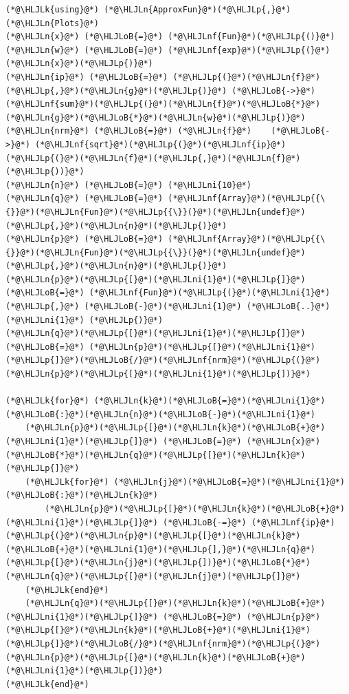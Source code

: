 \documentclass[12pt,a4paper]{article}
\newcommand{\HLJLk}[1]{\textcolor[RGB]{148,91,176}{\textbf{#1}}}
\newcommand{\HLJLn}[1]{#1}
\newcommand{\HLJLnf}[1]{\textcolor[RGB]{66,102,213}{#1}}
\newcommand{\HLJLni}[1]{\textcolor[RGB]{59,151,46}{#1}}
\newcommand{\HLJLoB}[1]{\textcolor[RGB]{102,102,102}{\textbf{#1}}}
\newcommand{\HLJLp}[1]{#1}
\begin{document}
\begin{lstlisting}
(*@\HLJLk{using}@*) (*@\HLJLn{ApproxFun}@*)(*@\HLJLp{,}@*) (*@\HLJLn{Plots}@*)
(*@\HLJLn{x}@*) (*@\HLJLoB{=}@*) (*@\HLJLnf{Fun}@*)(*@\HLJLp{()}@*)
(*@\HLJLn{w}@*) (*@\HLJLoB{=}@*) (*@\HLJLnf{exp}@*)(*@\HLJLp{(}@*)(*@\HLJLn{x}@*)(*@\HLJLp{)}@*)
(*@\HLJLn{ip}@*) (*@\HLJLoB{=}@*) (*@\HLJLp{(}@*)(*@\HLJLn{f}@*)(*@\HLJLp{,}@*)(*@\HLJLn{g}@*)(*@\HLJLp{)}@*) (*@\HLJLoB{->}@*) (*@\HLJLnf{sum}@*)(*@\HLJLp{(}@*)(*@\HLJLn{f}@*)(*@\HLJLoB{*}@*)(*@\HLJLn{g}@*)(*@\HLJLoB{*}@*)(*@\HLJLn{w}@*)(*@\HLJLp{)}@*)
(*@\HLJLn{nrm}@*) (*@\HLJLoB{=}@*) (*@\HLJLn{f}@*)    (*@\HLJLoB{->}@*) (*@\HLJLnf{sqrt}@*)(*@\HLJLp{(}@*)(*@\HLJLnf{ip}@*)(*@\HLJLp{(}@*)(*@\HLJLn{f}@*)(*@\HLJLp{,}@*)(*@\HLJLn{f}@*)(*@\HLJLp{))}@*)
(*@\HLJLn{n}@*) (*@\HLJLoB{=}@*) (*@\HLJLni{10}@*)
(*@\HLJLn{q}@*) (*@\HLJLoB{=}@*) (*@\HLJLnf{Array}@*)(*@\HLJLp{{\{}}@*)(*@\HLJLn{Fun}@*)(*@\HLJLp{{\}}(}@*)(*@\HLJLn{undef}@*)(*@\HLJLp{,}@*)(*@\HLJLn{n}@*)(*@\HLJLp{)}@*)
(*@\HLJLn{p}@*) (*@\HLJLoB{=}@*) (*@\HLJLnf{Array}@*)(*@\HLJLp{{\{}}@*)(*@\HLJLn{Fun}@*)(*@\HLJLp{{\}}(}@*)(*@\HLJLn{undef}@*)(*@\HLJLp{,}@*)(*@\HLJLn{n}@*)(*@\HLJLp{)}@*)
(*@\HLJLn{p}@*)(*@\HLJLp{[}@*)(*@\HLJLni{1}@*)(*@\HLJLp{]}@*) (*@\HLJLoB{=}@*) (*@\HLJLnf{Fun}@*)(*@\HLJLp{(}@*)(*@\HLJLni{1}@*)(*@\HLJLp{,}@*) (*@\HLJLoB{-}@*)(*@\HLJLni{1}@*) (*@\HLJLoB{..}@*) (*@\HLJLni{1}@*) (*@\HLJLp{)}@*)
(*@\HLJLn{q}@*)(*@\HLJLp{[}@*)(*@\HLJLni{1}@*)(*@\HLJLp{]}@*) (*@\HLJLoB{=}@*) (*@\HLJLn{p}@*)(*@\HLJLp{[}@*)(*@\HLJLni{1}@*)(*@\HLJLp{]}@*)(*@\HLJLoB{/}@*)(*@\HLJLnf{nrm}@*)(*@\HLJLp{(}@*)(*@\HLJLn{p}@*)(*@\HLJLp{[}@*)(*@\HLJLni{1}@*)(*@\HLJLp{])}@*)

(*@\HLJLk{for}@*) (*@\HLJLn{k}@*)(*@\HLJLoB{=}@*)(*@\HLJLni{1}@*)(*@\HLJLoB{:}@*)(*@\HLJLn{n}@*)(*@\HLJLoB{-}@*)(*@\HLJLni{1}@*)
    (*@\HLJLn{p}@*)(*@\HLJLp{[}@*)(*@\HLJLn{k}@*)(*@\HLJLoB{+}@*)(*@\HLJLni{1}@*)(*@\HLJLp{]}@*) (*@\HLJLoB{=}@*) (*@\HLJLn{x}@*)(*@\HLJLoB{*}@*)(*@\HLJLn{q}@*)(*@\HLJLp{[}@*)(*@\HLJLn{k}@*)(*@\HLJLp{]}@*)
    (*@\HLJLk{for}@*) (*@\HLJLn{j}@*)(*@\HLJLoB{=}@*)(*@\HLJLni{1}@*)(*@\HLJLoB{:}@*)(*@\HLJLn{k}@*)
        (*@\HLJLn{p}@*)(*@\HLJLp{[}@*)(*@\HLJLn{k}@*)(*@\HLJLoB{+}@*)(*@\HLJLni{1}@*)(*@\HLJLp{]}@*) (*@\HLJLoB{-=}@*) (*@\HLJLnf{ip}@*)(*@\HLJLp{(}@*)(*@\HLJLn{p}@*)(*@\HLJLp{[}@*)(*@\HLJLn{k}@*)(*@\HLJLoB{+}@*)(*@\HLJLni{1}@*)(*@\HLJLp{],}@*)(*@\HLJLn{q}@*)(*@\HLJLp{[}@*)(*@\HLJLn{j}@*)(*@\HLJLp{])}@*)(*@\HLJLoB{*}@*)(*@\HLJLn{q}@*)(*@\HLJLp{[}@*)(*@\HLJLn{j}@*)(*@\HLJLp{]}@*)
    (*@\HLJLk{end}@*)
    (*@\HLJLn{q}@*)(*@\HLJLp{[}@*)(*@\HLJLn{k}@*)(*@\HLJLoB{+}@*)(*@\HLJLni{1}@*)(*@\HLJLp{]}@*) (*@\HLJLoB{=}@*) (*@\HLJLn{p}@*)(*@\HLJLp{[}@*)(*@\HLJLn{k}@*)(*@\HLJLoB{+}@*)(*@\HLJLni{1}@*)(*@\HLJLp{]}@*)(*@\HLJLoB{/}@*)(*@\HLJLnf{nrm}@*)(*@\HLJLp{(}@*)(*@\HLJLn{p}@*)(*@\HLJLp{[}@*)(*@\HLJLn{k}@*)(*@\HLJLoB{+}@*)(*@\HLJLni{1}@*)(*@\HLJLp{])}@*)
(*@\HLJLk{end}@*)


\end{lstlisting}
\end{document}
